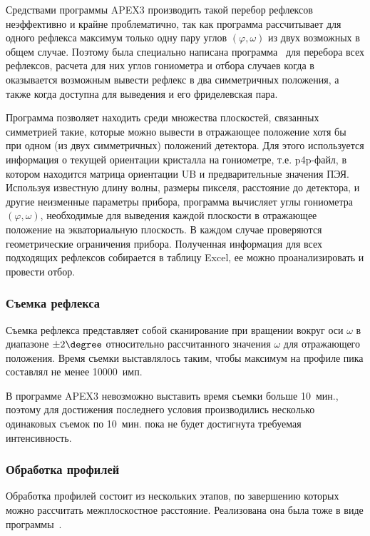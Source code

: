 Средствами программы APEX3 производить такой перебор рефлексов неэффективно и крайне проблематично, так как программа рассчитывает для одного рефлекса максимум только одну пару углов $(\varphi, \omega)$ из двух возможных в общем случае.
Поэтому была специально написана программа~\cite{Kudryavtsev:2024:eccentr} для перебора всех рефлексов, расчета для них углов гониометра и отбора случаев когда в оказывается возможным вывести рефлекс в два симметричных положения, а также когда доступна для выведения и его фриделевская пара.

Программа позволяет находить среди множества плоскостей, связанных симметрией такие, которые можно вывести в отражающее положение хотя бы при одном (из двух симметричных) положений детектора.
Для этого используется информация о текущей ориентации кристалла на гониометре, т.е. p4p-файл, в котором находится матрица ориентации UB и предварительные значения ПЭЯ.
Используя известную длину волны, размеры пикселя, расстояние до детектора, и другие неизменные параметры прибора, программа вычисляет углы гониометра $(\varphi, \omega)$, необходимые для выведения каждой плоскости в отражающее положение на экваториальную плоскость.
В каждом случае проверяются геометрические ограничения прибора.
Полученная информация для всех подходящих рефлексов собирается в таблицу Excel, ее можно проанализировать и провести отбор.
\subsubsection{Съемка рефлекса}
Съемка рефлекса представляет собой сканирование при вращении вокруг оси $\omega$ в диапазоне $\pm 2\degree$ относительно рассчитанного значения $\omega$ для отражающего положения.
Время съемки выставлялось таким, чтобы максимум на профиле пика составлял не менее 10000~имп.

В программе APEX3 невозможно выставить время съемки больше 10~мин., поэтому для достижения последнего условия производились несколько одинаковых съемок по 10~мин. пока не будет достигнута требуемая интенсивность.
\subsubsection{Обработка профилей}
Обработка профилей состоит из нескольких этапов, по завершению которых можно рассчитать межплоскостное расстояние.
Реализована она была тоже в виде программы~\cite{Kudryavtsev:2024:eccentr}.

